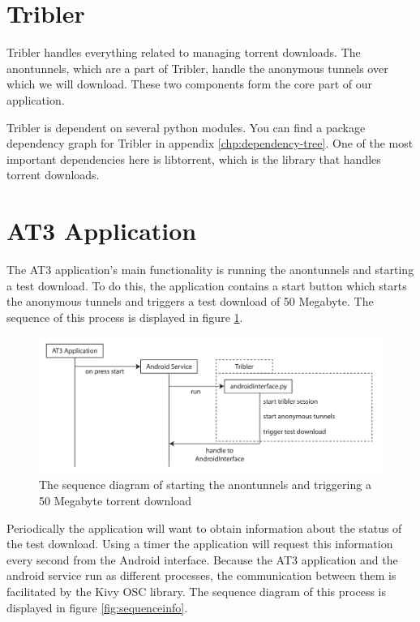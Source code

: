 \section{Tribler}
Tribler handles everything related to managing torrent downloads. The anontunnels, which are a part of Tribler, handle the anonymous tunnels over which we will download. These two components form the core part of our application.

Tribler is dependent on several python modules. You can find a package dependency graph for Tribler in appendix \ref{chp:dependency-tree}. One of the most important dependencies here is libtorrent, which is the library that handles torrent downloads.

\section{AT3 Application}
The AT3 application's main functionality is running the anontunnels and starting a test download. To do this, the application contains a start button which starts the anonymous tunnels and triggers a test download of 50 Megabyte. The sequence of this process is displayed in figure \ref{fig:sequencestart}.

\begin{figure}[h]
	\centering
	\includegraphics[width=\textwidth]{graphics/sequence-start.pdf}
	\caption{The sequence diagram of starting the anontunnels and triggering a 50 Megabyte torrent download}
	\label{fig:sequencestart}
\end{figure}

Periodically the application will want to obtain information about the status of the test download. Using a timer the application will request this information every second from the Android interface. Because the AT3 application and the android service run as different processes, the communication between them is facilitated by the Kivy OSC library. The sequence diagram of this process is displayed in figure \ref{fig:sequenceinfo}.

